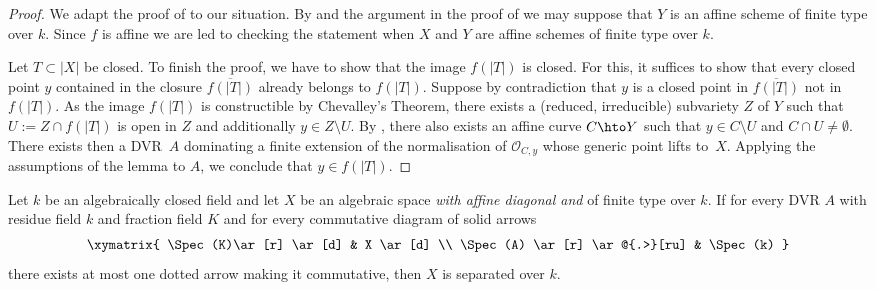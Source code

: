 \begin{proof}
We adapt the proof of \cite[\href{https://stacks.math.columbia.edu/tag/03KA}{Lem.\,03KA}]{stacks-project} to our situation.
By \cite[\href{https://stacks.math.columbia.edu/tag/03IT}{Lem.\,03IT}]{stacks-project} and the argument in the proof of \cite[\href{https://stacks.math.columbia.edu/tag/03IY}{Lem.\,03IY}]{stacks-project} we may suppose that $Y$ is an affine scheme of finite type over $k$.
Since $f$ is affine we are led to checking the statement when $X$ and $Y$ are affine schemes of finite type over $k$.

Let $T \subset |X|$ be closed. To finish the proof, we have to show that the image $f(|T|)$ is closed. For this, it suffices to show that every closed point $y$ contained in the closure $\overline{f(|T|)}$ already belongs to $f(|T|)$.
Suppose by contradiction that $y$ is a closed point in $\overline{f(|T|)}$ not in $f(|T|)$.
As the image $f(|T|)$ is constructible by Chevalley's Theorem, there exists a (reduced, irreducible) subvariety $Z$ of $Y$ such that $U:= Z \cap f(|T|)$ is open in $Z$ and additionally $y \in Z \setminus U$.
By \cite[Lem.\,7.2.1]{Kempf},
there also
exists an affine curve $C \hto Y$ such that $y \in C \setminus U$ and $C\cap U\neq\emptyset$. There exists then a DVR~$A$ dominating a finite extension of the normalisation of $\mathscr{O}_{C, y}$ whose generic point lifts to~$X$. Applying the assumptions of the lemma to $A$, we conclude that $y \in f(|T|)$.
\end{proof}

\begin{lemma}\label{rem:valuative criteria}
Let $k$ be an algebraically closed field and let $X$ be an algebraic space {\it with affine diagonal and} of finite type over $k$. If for every DVR $A$ with residue field $k$ and fraction field $K$ and for every commutative diagram of solid arrows
\begin{equation}
\label{diagr:valuative criterion finite type}
\begin{gathered}
\xymatrix{
\Spec(K)\ar[r] \ar[d] & X \ar[d] \\
\Spec(A) \ar[r] \ar@{.>}[ru] & \Spec(k)
}
\end{gathered}
\end{equation}
there exists at most one dotted arrow making it commutative, then $X$ is separated over $k$.
\end{lemma}

